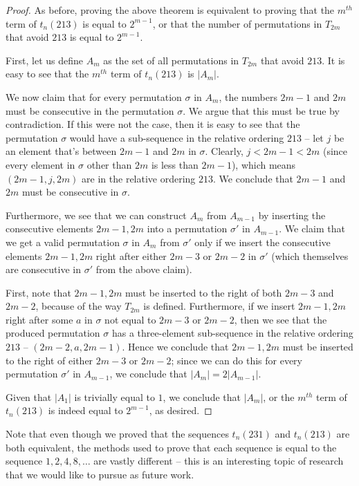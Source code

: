 \documentclass[11pt,letterpaper,twoside,english]{article}
\theoremstyle{theorem}
\theoremstyle{remark}
\begin{document}
\begin{proof}
As before, proving the above theorem is equivalent to proving that the $m^{th}$ term of $t_n(213)$ is equal to $2^{m-1}$, or that the number of permutations in $T_{2m}$ that avoid $213$ is equal to $2^{m-1}$.

First, let us define $A_m$ as the set of all permutations in $T_{2m}$ that avoid $213$. It is easy to see that the $m^{th}$ term of $t_n(213)$ is $|A_m|$.

We now claim that for every permutation $\sigma$ in $A_m$, the numbers $2m-1$ and $2m$ must be consecutive in the permutation $\sigma$. We argue that this must be true by contradiction. If this were not the case, then it is easy to see that the permutation $\sigma$ would have a sub-sequence in the relative ordering $213$ -- let $j$ be an element that's between $2m-1$ and $2m$ in $\sigma$. Clearly, $j < 2m -1 < 2m$ (since every element in $\sigma$ other than $2m$ is less than $2m-1$), which means $(2m - 1, j, 2m)$ are in the relative ordering $213$. We conclude that $2m-1$ and $2m$ must be consecutive in $\sigma$.

Furthermore, we see that we can construct $A_m$ from $A_{m-1}$ by inserting the consecutive elements $2m-1, 2m$ into a permutation $\sigma'$ in $A_{m-1}$. We claim that we get a valid permutation $\sigma$ in $A_m$ from $\sigma'$ only if we insert the consecutive elements $2m-1, 2m$ right after either $2m-3$ or $2m-2$ in $\sigma'$ (which themselves are consecutive in $\sigma'$ from the above claim).

First, note that $2m-1, 2m$ must be inserted to the right of both $2m-3$ and $2m-2$, because of the way $T_{2m}$ is defined. Furthermore, if we insert $2m-1, 2m$ right after some $a$ in $\sigma$ not equal to $2m-3$ or $2m-2$, then we see that the produced permutation $\sigma$ has a three-element sub-sequence in the relative ordering $213$ -- $(2m-2, a, 2m-1)$. Hence we conclude that $2m-1, 2m$ must be inserted to the right of either $2m-3$ or $2m-2$; since we can do this for every permutation $\sigma'$ in $A_{m-1}$, we conclude that $|A_m| = 2|A_{m-1}|$.

Given that $|A_1|$ is trivially equal to $1$, we conclude that $|A_m|$, or the $m^{th}$ term of $t_n(213)$ is indeed equal to $2^{m-1}$, as desired.
\end{proof}

Note that even though we proved that the sequences $t_n(231)$ and $t_n(213)$ are both equivalent, the methods used to prove that each sequence is equal to the sequence $1, 2, 4, 8, \ldots$ are vastly different -- this is an interesting topic of research that we would like to pursue as future work.
\end{document}
